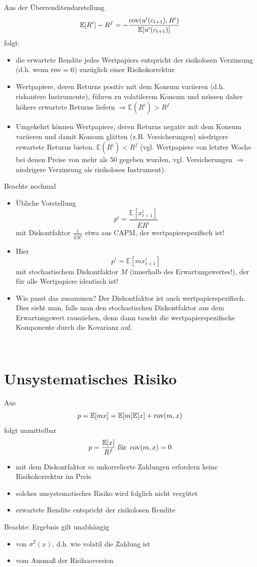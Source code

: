 \documentclass[12pt]{extreport} %
\theoremstyle{named}
\theoremstyle{nnamed}
\theoremstyle{itshape}
\theoremstyle{normal}
\begin{document}
Aus der Überrenditendarstellung 
		$$ \mathbb{E}[R^i] - R^f = -\frac{\operatorname{cov}(u'(c_{t+1}), R^i)}{\mathbb{E}[u'(c_{t+1})]} $$
folgt:
\begin{itemize}
	\item die erwartete Rendite jedes Wertpapiers entspricht der risikolosen Verzinsung (d.h. wenn $\operatorname{cov} = 0$) zuzüglich einer Risikokorrektur
	\item Wertpapiere, deren Returns positiv mit dem Konsum variieren (d.h. riskantere Instrumente), führen zu volatilerem Konsum und müssen daher höhere erwartete Returns liefern $\Rightarrow \mathbb{E}(R^i) > R^f$
	\item Umgekehrt können Wertpapiere, deren Returns negativ mit dem Konsum variieren und damit Konsum glätten (z.B. Versicherungen) niedrigere erwartete Returns bieten. $\mathbb{E}(R^i) < R^f$ (vgl. Wertpapiere von letzter Woche bei denen Preise von mehr als 50 gegeben wurden, vgl. Versicherungen $\Rightarrow$ niedrigere Verzinsung als risikoloses Instrument).
\end{itemize}

Beachte nochmal

\begin{itemize}
	\item Übliche Vorstellung
		$$ p^i = \frac{\mathbb{E}[x_{t+1}^i]}{ER^i} $$
		mit Diskontfaktor $\frac{1}{ER^i}$ etwa aus CAPM, der wertpapierspezifisch ist!
	\item Hier
		$$ p^i = \mathbb{E}[m x_{t+1}^i] $$
		mit stochastischem Diskontfaktor $M$ (innerhalb des Erwartungswertes!), der für alle Wertpapiere identisch ist!
	\item Wie passt das zusammen? Der Diskontfaktor ist auch wertpapierspezifisch. Dies sieht man, falls man den stochastischen Diskontfaktor aus dem Erwartungswert rausziehen, denn dann taucht die wertpapierspezifische Komponente durch die Kovarianz auf.
\end{itemize}

~\newpage

\section{Unsystematisches Risiko}

Aus 
$$ p = \mathbb{E}[mx] = \mathbb{E}[m] \mathbb{E} [x] + \operatorname{cov}(m,x)$$
folgt unmittelbar
$$ p = \frac{\mathbb{E}[x]}{R^f} \text{ für } \operatorname{cov}(m, x) = 0 $$
\begin{itemize}
	\item mit dem Diskontfaktor $m$ unkorrelierte Zahlungen erfordern keine Risikokorrektur im Preis
	\item solches unsystematisches Risiko wird folglich nicht vergütet
	\item erwartete Rendite entspricht der risikolosen Rendite
\end{itemize}
Beachte: Ergebnis gilt unabhängig
\begin{itemize}
	\item von $\sigma^2(x)$, d.h. wie volatil die Zahlung ist
	\item vom Ausmaß der Risikoaversion
\end{itemize}
\end{document}

